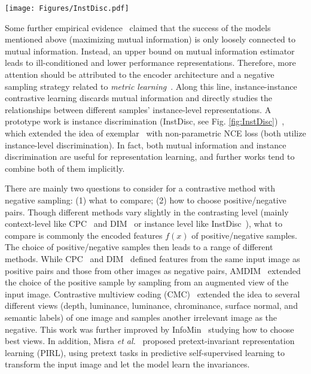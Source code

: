 \documentclass[lettersize,journal]{IEEEtran}
\newcommand{\etal}{\textit{et al.}}
\begin{document}
\begin{figure*}
\centering
\texttt{[image: Figures/InstDisc.pdf]}
\caption[InstDisc]{Instance Discrimination (InstDisc)~\cite{wu2018unsupervised}. A backbone CNN is used to encode each image as a feature vector, which is projected to a 128-dimensional space and L2 normalized. The optimal feature embedding is learned via instance-level
discrimination, which tries to maximally scatter the features of training samples over the 128-dimensional unit sphere. ©[2018] IEEE.}
\label{fig:InstDisc}
\end{figure*}



Some further empirical evidence~\cite{tschannen2019mutual} claimed that the success of the models mentioned above (maximizing mutual information) is only loosely connected to mutual information. Instead, an upper bound on mutual information estimator leads to ill-conditioned and lower performance representations. Therefore, more attention should be attributed to the encoder architecture and a negative sampling strategy related to \textit{metric learning}~\cite{kulis2013metric}. Along this line, instance-instance contrastive learning discards mutual information and directly studies the relationships between different samples’ instance-level representations. A prototype work is instance discrimination (InstDisc, see Fig. \ref{fig:InstDisc})~\cite{wu2018unsupervised}, which extended the idea of exemplar~\cite{dosovitskiy2014discriminative} with non-parametric NCE loss (both utilize instance-level discrimination). In fact, both mutual information and instance discrimination are useful for representation learning, and further works tend to combine both of them implicitly.


There are mainly two questions to consider for a contrastive method with negative sampling: (1) what to compare; (2) how to choose positive/negative pairs. Though different methods vary slightly in the contrasting level (mainly context-level like CPC~\cite{oord2018representation} and DIM~\cite{hjelm2018learning} or instance level like InstDisc~\cite{wu2018unsupervised}), what to compare is commonly the encoded features $f(x)$ of positive/negative samples. The choice of positive/negative samples then leads to a range of different methods. While CPC~\cite{oord2018representation} and DIM~\cite{hjelm2018learning} defined features from the same input image as positive pairs and those from other images as negative pairs, AMDIM~\cite{bachman2019learning} extended the choice of the positive sample by sampling from an augmented view of the input image. Contrastive multiview coding (CMC)~\cite{tian2020contrastive} extended the idea to several different views (depth, luminance, luminance, chrominance, surface normal, and semantic labels) of one image and samples another irrelevant image as the negative. This work was further improved by InfoMin~\cite{tian2020makes} studying how to choose best views. In addition, Misra \etal~\cite{misra2020self} proposed pretext-invariant representation learning (PIRL), using pretext tasks in predictive self-supervised learning to transform the input image and let the model learn the invariances.
\end{document}
